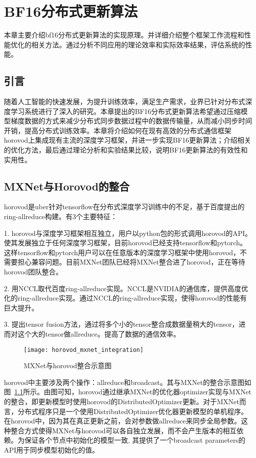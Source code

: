 \chapter{BF16分布式更新算法}
本章主要介绍bf16分布式更新算法的实现原理。并详细介绍整个框架工作流程和性能优化的相关方法。通过分析不同应用的理论效率和实际效率结果，评估系统的性能。
\section{引言}
随着人工智能的快速发展，为提升训练效率，满足生产需求，业界已针对分布式深度学习系统进行了深入的研究。本章提出的BF16分布式更新算法希望通过压缩模型梯度数据的方式来减少分布式同步数据过程中的数据传输量，从而减小同步时间开销，提高分布式训练效率。本章将介绍如何在现有高效的分布式通信框架horovod上集成现有主流的深度学习框架，并进一步实现BF16更新算法；介绍相关的优化方法，最后通过理论分析和实验结果比较，说明BF16更新算法的有效性和实用性。
\section{MXNet与Horovod的整合}
horovod是uber针对tensorflow在分布式深度学习训练中的不足，基于百度提出的ring-allreduce构建。有3个主要特征：

1. horovod与深度学习框架相互独立，用户以python包的形式调用horovod的API。使其发展独立于任何深度学习框架，目前horovod已经支持tensorflow和pytorch。这样tensorflow和pytorch用户可以在任意版本的深度学习框架中使用horovod，不需要担心兼容问题。目前MXNet团队已经将MXNet整合进了horovod，正在等待horovod团队整合。

2. 用NCCL取代百度ring-allreduce实现。NCCL是NVIDIA的通信库，提供高度优化的ring-allreduce实现。通过NCCL的ring-allreduce实现，使得horovod的性能有巨大提升。

3. 提出tensor fusion方法，通过将多个小的tensor整合成数据量稍大的tensor，进而对这个大的tensor做allreduce。提高了数据的通信效率。

\begin{figure}[htp]
\centering
\texttt{[image: horovod\_mxnet\_integration]}
\caption{MXNet与horovod整合示意图}
\label{fig:horovod_mxnet_integration}
\end{figure}
horovod中主要涉及两个操作：allreduce和broadcast。其与MXNet的整合示意图如图~\ref{fig:horovod_mxnet_integration}所示。由图可知，horovod通过继承MXNet的优化器optimizer实现与MXNet的整合，即更新模型时使用horovod的DistributedOptimizer更新。对于MXNet而言，分布式程序只是一个使用DistributedOptimizer优化器更新模型的单机程序。在horovod中，因为其在真正更新之前，会对参数做allreduce来同步全局参数。这种整合方式使得MXNet与horovod可以各自独立发展，而不会产生版本的相互依赖。为保证各个节点中初始化的模型一致, 其提供了一个broadcast parameters的API用于同步模型初始化的值。


